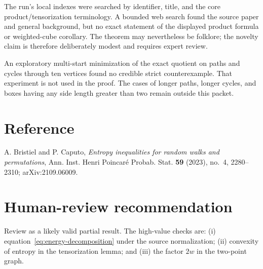 \documentclass[11pt]{article}
\begin{document}
The run's local indexes were searched by identifier, title, and the core
product/tensorization terminology.  A bounded web search found the source
paper and general background, but no exact statement of the displayed
product formula or weighted-cube corollary.  The theorem may nevertheless be
folklore; the novelty claim is therefore deliberately modest and requires
expert review.

An exploratory multi-start minimization of the exact quotient on paths and
cycles through ten vertices found no credible strict counterexample.  That
experiment is not used in the proof.  The cases of longer paths, longer
cycles, and boxes having any side length greater than two remain outside this
packet.

\section*{Reference}

A. Bristiel and P. Caputo, \emph{Entropy inequalities for random walks and
permutations}, Ann. Inst. Henri Poincar\'e Probab. Stat.
\textbf{59} (2023), no.~4, 2280--2310; arXiv:2109.06009.

\section*{Human-review recommendation}

Review as a likely valid partial result.  The high-value checks are:
(i) equation~\eqref{eq:energy-decomposition} under the source normalization;
(ii) convexity of entropy in the tensorization lemma; and (iii) the factor
\(2w\) in the two-point graph.
\end{document}
